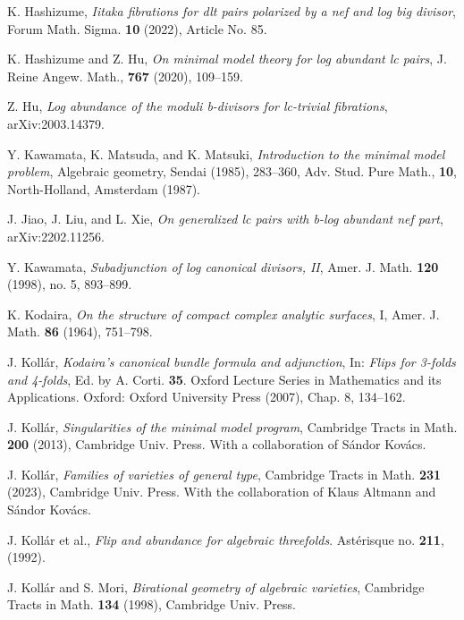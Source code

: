 \documentclass[11pt]{amsart}
\numberwithin{equation}{section}
\theoremstyle{definition}
\theoremstyle{definition}
\theoremstyle{definition}
\begin{document}
\begin{thebibliography}{99}
 K. Hashizume, \textit{Iitaka fibrations for dlt pairs polarized by a nef and log big divisor}, Forum Math. Sigma. \textbf{10} (2022), Article No. 85.

  K. Hashizume and Z. Hu, \textit{On minimal model theory for log abundant lc pairs}, J. Reine Angew. Math., \textbf{767} (2020), 109--159. 


 Z. Hu, \textit{Log abundance of the moduli b-divisors for lc-trivial fibrations}, arXiv:2003.14379.

 Y. Kawamata, K. Matsuda, and K. Matsuki, \textit{Introduction to the minimal model problem}, Algebraic geometry, Sendai (1985), 283--360, Adv. Stud. Pure Math., \textbf{10}, North-Holland, Amsterdam (1987).

 J. Jiao, J. Liu, and L. Xie, \textit{On generalized lc pairs with b-log abundant nef part}, arXiv:2202.11256.

 Y. Kawamata, \textit{Subadjunction of log canonical divisors, II}, Amer. J. Math. \textbf{120} (1998), no. 5, 893--899.

 K. Kodaira, \textit{On the structure of compact complex analytic surfaces}, I, Amer. J. Math. \textbf{86} (1964), 751--798.


 J. Koll\'ar, \textit{Kodaira’s canonical bundle formula and adjunction}, In: \textit{Flips for 3-folds and 4-folds}, Ed. by A. Corti. \textbf{35}. Oxford Lecture Series in Mathematics and its Applications. Oxford: Oxford University Press (2007), Chap. 8, 134--162.

 J. Koll\'ar, \textit{Singularities of the minimal model program}, Cambridge Tracts in Math. \textbf{200} (2013), Cambridge Univ. Press. With a collaboration of S\'andor Kov\'acs.

 J. Koll\'ar, \textit{Families of varieties of general type}, Cambridge Tracts in Math. \textbf{231} (2023), Cambridge Univ. Press. With the collaboration of Klaus Altmann and S\'andor Kov\'acs.


 J. Koll\'{a}r et al., \textit{Flip and abundance for algebraic threefolds}. Ast\'{e}risque no. \textbf{211}, (1992).

 J. Koll\'{a}r and S. Mori, \textit{Birational geometry of algebraic varieties}, Cambridge Tracts in Math. \textbf{134} (1998), Cambridge Univ. Press.


\end{thebibliography}
\end{document}
